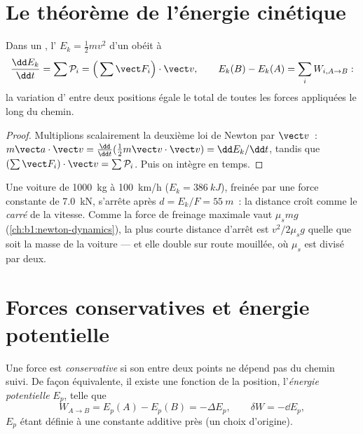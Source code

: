 \section{Le théorème de l'énergie cinétique}

\begin{theorem}\label{thm:b1:work-and-energy:ke}
Dans un , l'\emph{}
$E_k = \tfrac12 mv^2$ d'un  obéit à
\[
\frac{\dd E_k}{\dd t} = \sum\mathcal P_i = \Big(\sum\vect F_i\Big)\cdot\vect v,
\qquad
E_k(B) - E_k(A) = \sum_i W_{i,A\to B}:
\]
la variation d' entre deux positions égale le 
total de toutes les forces appliquées le long du chemin.
\end{theorem}

\begin{proof}
Multiplions scalairement la deuxième loi de Newton par $\vect v$~: $m\vect a\cdot\vect v =
\tfrac{\dd}{\dd t}(\tfrac12 m\vect v\cdot\vect v) = \dd E_k/\dd t$, tandis que
$(\sum\vect F_i)\cdot\vect v = \sum\mathcal P_i$. Puis on intègre en temps.
\end{proof}

\begin{example}\label{ex:b1:work-and-energy:braking}
Une voiture de \qty{1000}{kg} à \qty{100}{km/h} ($E_k = \qty{386}{kJ}$),
freinée par une force constante de \qty{7.0}{kN}, s'arrête après
$d = E_k/F = \qty{55}{m}$~: la distance croît comme le \emph{carré} de la
vitesse. Comme la force de freinage maximale vaut $\mu_smg$
(\cref{ch:b1:newton-dynamics}), la plus courte distance d'arrêt est
$v^2/2\mu_sg$ quelle que soit la masse de la voiture --- et elle double
sur route mouillée, où $\mu_s$ est divisé par deux.
\end{example}

\section{Forces conservatives et énergie potentielle}

\begin{definition}\label{def:b1:work-and-energy:conservative}
Une force est \emph{conservative} si son  entre deux points ne
dépend pas du chemin suivi. De façon équivalente, il existe une fonction
de la position, l'\emph{énergie potentielle} $E_p$, telle que
\[
W_{A\to B} = E_p(A) - E_p(B) = -\Delta E_p ,
\qquad \delta W = -\dd E_p ,
\]
$E_p$ étant définie à une constante additive près (un choix d'origine).
\end{definition}

